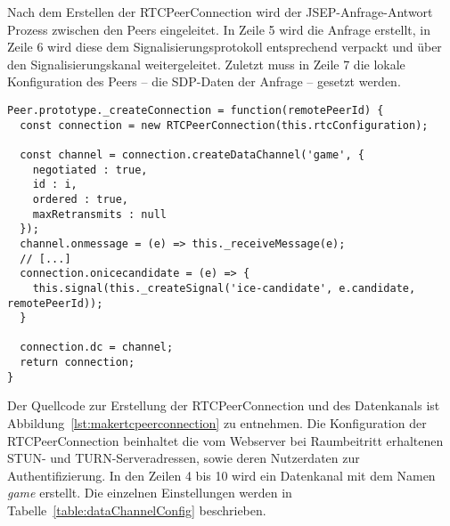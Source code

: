 Nach dem Erstellen der RTCPeerConnection wird der \acs{JSEP}-Anfrage-Antwort Prozess zwischen den Peers eingeleitet. In Zeile 5 wird die Anfrage erstellt, in Zeile 6 wird diese dem Signalisierungsprotokoll entsprechend verpackt und über den Signalisierungskanal weitergeleitet. Zuletzt muss in Zeile 7 die lokale Konfiguration des Peers -- die SDP-Daten der Anfrage -- gesetzt werden.

\lstset{language=js, style=STYLE_CODE_JS}
\begin{minipage}{\textwidth}
\begin{singlespace}
\begin{lstlisting}[caption={Erstellen von Verbindungen und Datenkanälen -- peer.js}, captionpos=b, label={lst:makertcpeerconnection}]
Peer.prototype._createConnection = function(remotePeerId) {
  const connection = new RTCPeerConnection(this.rtcConfiguration);

  const channel = connection.createDataChannel('game', {
    negotiated : true,
    id : i,
    ordered : true,
    maxRetransmits : null
  });
  channel.onmessage = (e) => this._receiveMessage(e);
  // [...]
  connection.onicecandidate = (e) => {
    this.signal(this._createSignal('ice-candidate', e.candidate, remotePeerId));
  }
 
  connection.dc = channel;
  return connection;
}
\end{lstlisting}
\end{singlespace}
\end{minipage}

Der Quellcode zur Erstellung der RTCPeerConnection und des Datenkanals ist Abbildung~\ref{lst:makertcpeerconnection} zu entnehmen. Die Konfiguration der RTCPeerConnection beinhaltet die vom Webserver bei Raumbeitritt erhaltenen STUN- und TURN-Serveradressen, sowie deren Nutzerdaten zur Authentifizierung. In den Zeilen 4 bis 10 wird ein Datenkanal mit dem Namen \textit{game} erstellt. Die einzelnen Einstellungen werden in Tabelle~\ref{table:dataChannelConfig} beschrieben.

